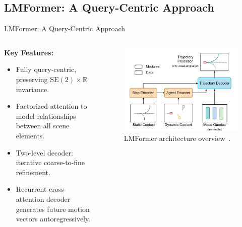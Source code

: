 \documentclass[10pt,aspectratio=169]{beamer}
\begin{document}
\subsection{LMFormer: A Query-Centric Approach}

\begin{frame}{LMFormer: A Query-Centric Approach}
    \begin{columns}[T]
        \begin{column}{0.5\textwidth}
            \textbf{Key Features:}
            \begin{itemize}
                \item Fully query-centric, preserving \(\mathrm{SE}(2) \times \mathbb{R}\) invariance.
                \item Factorized attention to model relationships between all scene elements.
                \item Two-level decoder: iterative coarse-to-fine refinement.
                \item Recurrent cross-attention decoder generates future motion vectors autoregressively.
            \end{itemize}
        \end{column}
        \begin{column}{0.5\textwidth}
            \begin{figure}
                \includegraphics[width=\textwidth]{docs/figures/lmformer_arch.png}
                \caption{LMFormer architecture overview~\cite{lmformerYadav2025}.}
            \end{figure}
        \end{column}
    \end{columns}
\end{frame}
\end{document}
